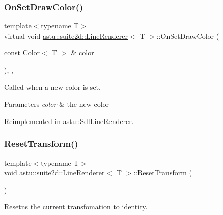 \subsubsection{\texorpdfstring{On\+Set\+Draw\+Color()}{OnSetDrawColor()}}
{\footnotesize\ttfamily template$<$typename T$>$ \\
virtual void \hyperlink{classastu_1_1suite2d_1_1LineRenderer}{astu\+::suite2d\+::\+Line\+Renderer}$<$ T $>$\+::On\+Set\+Draw\+Color (\begin{DoxyParamCaption}\item[{const \hyperlink{classastu_1_1Color}{Color}$<$ T $>$ \&}]{color }\end{DoxyParamCaption})\hspace{0.3cm}{\ttfamily [inline]}, {\ttfamily [protected]}, {\ttfamily [virtual]}}

Called when a new color is set.


\begin{DoxyParams}{Parameters}
{\em color} & the new color \\
\hline
\end{DoxyParams}


Reimplemented in \hyperlink{classastu_1_1SdlLineRenderer_aefdce772cba5d63ad8c4608df63879f9}{astu\+::\+Sdl\+Line\+Renderer}.

\mbox{\label{classastu_1_1suite2d_1_1LineRenderer_a8fbd3ea6e7dd82a7fc6e185c24546c85}} 
\subsubsection{\texorpdfstring{Reset\+Transform()}{ResetTransform()}}
{\footnotesize\ttfamily template$<$typename T$>$ \\
void \hyperlink{classastu_1_1suite2d_1_1LineRenderer}{astu\+::suite2d\+::\+Line\+Renderer}$<$ T $>$\+::Reset\+Transform (\begin{DoxyParamCaption}{ }\end{DoxyParamCaption})\hspace{0.3cm}{\ttfamily [inline]}}

Resetns the current transfomation to identity. \mbox{\label{classastu_1_1suite2d_1_1LineRenderer_a8e1feec71ad1dcddfdd05b575ea60c4c}} 
